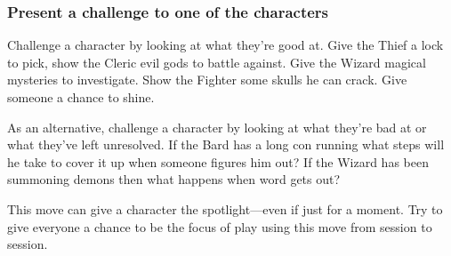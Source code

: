  
\subsubsection{Present a challenge to one of the characters}     
 

Challenge a character by looking at what they're good at. Give the Thief a lock to pick, show the Cleric evil gods to battle against. Give the Wizard magical mysteries to investigate. Show the Fighter some skulls he can crack. Give someone a chance to shine.

 

As an alternative, challenge a character by looking at what they're bad at or what they've left unresolved. If the Bard has a long con running what steps will he take to cover it up when someone figures him out? If the Wizard has been summoning demons then what happens when word gets out?

 

This move can give a character the spotlight—even if just for a moment. Try to give everyone a chance to be the focus of play using this move from session to session.

 





 
